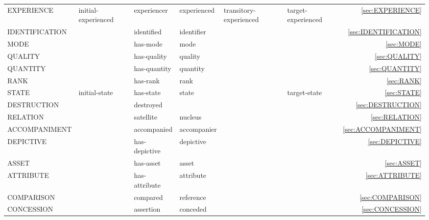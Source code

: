 \documentclass[a4paper]{article}
\newcommand{\fr}[1]{\textsf{#1}}
\newcommand{\rl}[1]{\textsf{#1}}
\newcommand{\Sub}{\textnoto{└} }
\newcommand{\SubSub}{\textcolor{white}{\Sub}\Sub}
\newcommand{\SubSubSub}{\textcolor{white}{\Sub}\SubSub}
\begin{document}
\begin{table}
{\begin{NiceTabular}{llllllr}
            \SubSub{} \fr{EXPERIENCE} & \rl{initial-experienced} & \rl{experiencer} & \rl{experienced} & \rl{transitory-experienced} & \rl{target-experienced} & \ref{sec:EXPERIENCE} \\

            \SubSub{} \fr{IDENTIFICATION} & & \rl{identified} & \rl{identifier} & & & \ref{sec:IDENTIFICATION} \\

            \SubSub{} \fr{MODE} & & \rl{has-mode} & \rl{mode} & & & \ref{sec:MODE} \\

            \SubSub{} \fr{QUALITY} & & \rl{has-quality} & \rl{quality} & & & \ref{sec:QUALITY} \\

            \SubSub{} \fr{QUANTITY} & & \rl{has-quantity} & \rl{quantity} & & & \ref{sec:QUANTITY} \\

            \SubSub{} \fr{RANK} & & \rl{has-rank} & \rl{rank} & & & \ref{sec:RANK} \\

            \SubSub{} \fr{STATE} & \rl{initial-state} & \rl{has-state} & \rl{state} & & \rl{target-state} & \ref{sec:STATE} \\
            \SubSubSub{} \fr{DESTRUCTION} & & \rl{destroyed} & & & & \ref{sec:DESTRUCTION} \\

            \Sub{} \fr{RELATION} & & \rl{satellite} & \rl{nucleus} & & & \ref{sec:RELATION} \\

            \SubSub{} \fr{ACCOMPANIMENT} & & \rl{accompanied} & \rl{accompanier} & & & \ref{sec:ACCOMPANIMENT} \\
            \SubSubSub{} \fr{DEPICTIVE} & & \rl{has-depictive} & \rl{depictive} & & & \ref{sec:DEPICTIVE} \\

            \SubSub{} \fr{ASSET} & & \rl{has-asset} & \rl{asset} & & & \ref{sec:ASSET} \\

            \SubSub{} \fr{ATTRIBUTE} & & \rl{has-attribute} & \rl{attribute} & & & \ref{sec:ATTRIBUTE} \\

            \SubSub{} \fr{COMPARISON} & & \rl{compared} & \rl{reference} & & & \ref{sec:COMPARISON} \\
            \SubSubSub{} \fr{CONCESSION} & & \rl{assertion} & \rl{conceded} & & & \ref{sec:CONCESSION} \\


\end{NiceTabular}}
\end{table}
\end{document}
